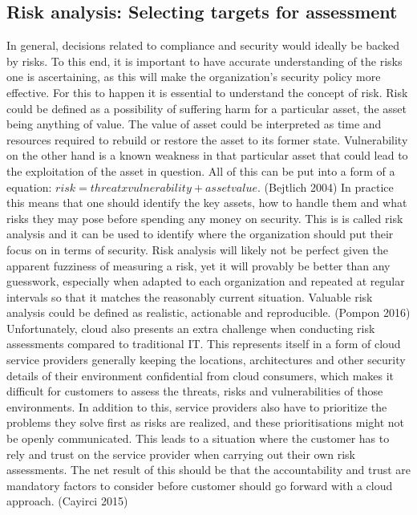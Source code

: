\documentclass{article}
\begin{document}
\subsection{Risk analysis: Selecting targets for assessment}
In general, decisions related to compliance and security would ideally be backed by risks. To this end, it is important to have accurate understanding of the risks one is ascertaining, as this will make the organization's security policy more effective.
For this to happen it is essential to understand the concept of risk. Risk could be defined as a possibility of suffering harm for a particular asset, the asset being anything of value. The value of asset could be interpreted as time and resources required to rebuild or restore the asset to its former state. Vulnerability on the other hand is a known weakness in that particular asset that could lead to the exploitation of the asset in question. All of this can be put into a form of a equation: $risk = threat x vulnerability + asset value$. (Bejtlich 2004)
In practice this means that one should identify the key assets, how to handle them and what risks they may pose before spending any money on security. This is is called risk analysis and it can be used to identify where the organization should put their focus on in terms of security. Risk analysis will likely not be perfect given the apparent fuzziness of measuring a risk, yet it will provably be better than any guesswork, especially when adapted to each organization and repeated at regular intervals so that it matches the reasonably current situation. Valuable risk analysis could be defined as realistic, actionable and reproducible. (Pompon 2016)
Unfortunately, cloud also presents an extra challenge when conducting risk assessments compared to traditional IT. This represents itself in a form of cloud service providers generally keeping the locations, architectures and other security details of their environment confidential from cloud consumers, which makes it difficult for customers to assess the threats, risks and vulnerabilities of those environments. In addition to this, service providers also have to prioritize the problems they solve first as risks are realized, and these prioritisations might not be openly communicated. This leads to a situation where the customer has to rely and trust on the service provider when carrying out their own risk assessments. The net result of this should be that the accountability and trust are mandatory factors to consider before customer should go forward with a cloud approach. (Cayirci 2015)
\par
\end{document}
